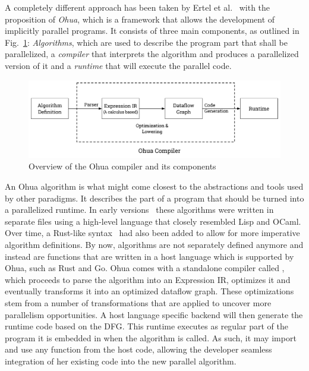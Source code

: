 A completely different approach has been taken by Ertel et al.~\cite{ertel2019dis} with the proposition of \emph{Ohua}, which is a framework that allows the development of implicitly parallel programs.
It consists of three main components, as outlined in Fig.~\ref{fig:background:ohua}:
\emph{Algorithms}, which are used to describe the program part that shall be parallelized, a \emph{compiler} that interprets the algorithm and produces a parallelized version of it and a \emph{runtime} that will execute the parallel code.

\begin{figure}[h]
    \includegraphics[width=\textwidth,keepaspectratio]{gfx/background-ohua}
    \caption{Overview of the Ohua compiler and its components}%
    \label{fig:background:ohua}
\end{figure}

An Ohua algorithm is what might come closest to the abstractions and tools used by other paradigms.
It describes the part of a program that should be turned into a parallelized runtime.
In early versions~\cite{ertel2015ohua} these algorithms were written in separate files using a high-level language that closely resembled Lisp and OCaml.
Over time, a Rust-like syntax~\cite{adam2019master} had also been added to allow for more imperative algorithm definitions.
By now, algorithms are not separately defined anymore and instead are functions that are written in a host language which is supported by Ohua, such as Rust and Go.
Ohua comes with a standalone compiler called , which proceeds to parse the algorithm into an Expression IR, optimizes it and eventually transforms it into an optimized dataflow graph.
These optimizations stem from a number of transformations that are applied to uncover more parallelism opportunities.
A host language specific backend will then generate the runtime code based on the DFG.
This runtime executes as regular part of the program it is embedded in when the algorithm is called.
As such, it may import and use any function from the host code, allowing the developer seamless integration of her existing code into the new parallel algorithm.

